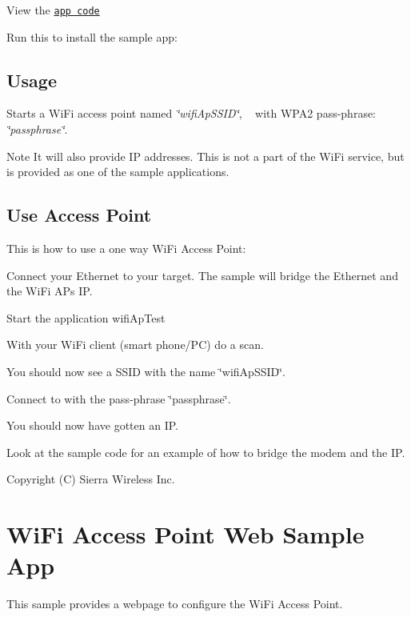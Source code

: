 View the \href{https://github.com/legatoproject/legato-WiFi/tree/master/apps/sample/wifiApTest}{\tt app code}

Run this to install the sample app\+: 
\hypertarget{wifi_wifiap_testapp_wifi_wifiap_testapp_usage}{}\subsection{Usage}\label{wifi_wifiap_testapp_wifi_wifiap_testapp_usage}
Starts a Wi\+Fi access point named {\itshape \char`\"{}wifi\+Ap\+S\+S\+I\+D\char`\"{}}, ~\newline
 with W\+P\+A2 pass-\/phrase\+: {\itshape \char`\"{}passphrase\char`\"{}}.

\begin{DoxyNote}{Note}
It will also provide IP addresses. This is not a part of the Wi\+Fi service, but is provided as one of the sample applications.
\end{DoxyNote}
\hypertarget{wifi_wifiap_testapp_wifi_wifiap_testapp_StepByStep}{}\subsection{Use Access Point}\label{wifi_wifiap_testapp_wifi_wifiap_testapp_StepByStep}
This is how to use a one way Wi\+Fi Access Point\+:


\begin{DoxyEnumerate}
\item Connect your Ethernet to your target. The sample will bridge the Ethernet and the Wi\+Fi A\+Ps IP.
\item Start the application wifi\+Ap\+Test
\item With your Wi\+Fi client (smart phone/\+PC) do a scan.
\item You should now see a S\+S\+ID with the name \char`\"{}wifi\+Ap\+S\+S\+I\+D\char`\"{}.
\item Connect to with the pass-\/phrase \char`\"{}passphrase\char`\"{}.
\item You should now have gotten an IP.
\end{DoxyEnumerate}

Look at the sample code for an example of how to bridge the modem and the IP.

Copyright (C) Sierra Wireless Inc. \hypertarget{wifi_wifiwebAp_sample}{}\section{Wi\+Fi Access Point Web Sample App}\label{wifi_wifiwebAp_sample}
This sample provides a webpage to configure the Wi\+Fi Access Point.

